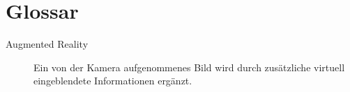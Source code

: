 \section{Glossar}
\begin{description}
 	\item[Augmented Reality] Ein von der Kamera aufgenommenes Bild wird durch zusätzliche virtuell eingeblendete Informationen ergänzt.
\end{description}